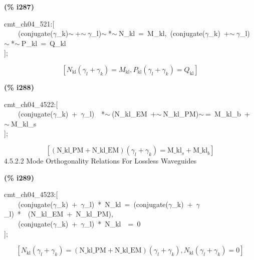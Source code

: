 \documentclass[fleqn]{article}
\begin{document}
\noindent
\begin{minipage}[t]{4.000000em}\color{red}\bfseries
(\% i287)	
\end{minipage}
\begin{minipage}[t]{\textwidth}\color{blue}
cmt\_ch04\_521:[\\
\ \ \ \ (conjugate(\ensuremath{\gamma}\_k)\ensuremath{\sim\ }+\ensuremath{\sim\ }\ensuremath{\gamma}\_l)\ensuremath{\sim\ }*\ensuremath{\sim\ }N\_kl\ =\ M\_kl,\ (conjugate(\ensuremath{\gamma}\_k)\ +\ensuremath{\sim\ }\ensuremath{\gamma}\_l)\ensuremath{\sim\ }*\ensuremath{\sim\ }P\_kl\ =\ Q\_kl\\
];
\end{minipage}
\[\displaystyle \tag{\% o287} 
\left[ {N_{\ensuremath{\mathrm{kl}}}} \left( {{\gamma }_l}+{{\gamma }_k}\right) ={M_{\ensuremath{\mathrm{kl}}}}\operatorname{,}{P_{\ensuremath{\mathrm{kl}}}} \left( {{\gamma }_l}+{{\gamma }_k}\right) ={Q_{\ensuremath{\mathrm{kl}}}}\right] \mbox{}
\]


\noindent
\begin{minipage}[t]{4.000000em}\color{red}\bfseries
(\% i288)	
\end{minipage}
\begin{minipage}[t]{\textwidth}\color{blue}
cmt\_ch04\_4522:[\\
\ \ \ \ (conjugate(\ensuremath{\gamma}\_k)\ +\ \ensuremath{\gamma}\_l)\ \ *\ensuremath{\sim\ }(N\_kl\_EM\ +\ensuremath{\sim\ }N\_kl\_PM)\ensuremath{\sim\ }=\ M\_kl\_b\ +\ensuremath{\sim\ }M\_kl\_s\\
];
\end{minipage}
\[\displaystyle \tag{\% o288} 
\left[ \left( \ensuremath{\mathrm{N\_ kl\_ PM}}+\ensuremath{\mathrm{N\_ kl\_ EM}}\right)  \left( {{\gamma }_l}+{{\gamma }_k}\right) ={{\ensuremath{\mathrm{M\_ kl}}}_s}+{{\ensuremath{\mathrm{M\_ kl}}}_b}\right] \mbox{}
\]
4.5.2.2     Mode Orthogonality Relations For Lossless Waveguides


\noindent
\begin{minipage}[t]{4.000000em}\color{red}\bfseries
(\% i289)	
\end{minipage}
\begin{minipage}[t]{\textwidth}\color{blue}
cmt\_ch04\_4523:[\\
\ \ \ \ (conjugate(\ensuremath{\gamma}\_k)\ +\ \ensuremath{\gamma}\_l)\ *\ N\_kl\ =\ (conjugate(\ensuremath{\gamma}\_k)\ +\ \ensuremath{\gamma}\_l)\ *\ \ (N\_kl\_EM\ +\ N\_kl\_PM),\\
\ \ \ \ (conjugate(\ensuremath{\gamma}\_k)\ +\ \ensuremath{\gamma}\_l)\ *\ N\_kl\ \ =\ 0\\
];
\end{minipage}
\[\displaystyle \tag{\% o289} 
\left[ {N_{\ensuremath{\mathrm{kl}}}} \left( {{\gamma }_l}+{{\gamma }_k}\right) =\left( \ensuremath{\mathrm{N\_ kl\_ PM}}+\ensuremath{\mathrm{N\_ kl\_ EM}}\right)  \left( {{\gamma }_l}+{{\gamma }_k}\right) \operatorname{,}{N_{\ensuremath{\mathrm{kl}}}} \left( {{\gamma }_l}+{{\gamma }_k}\right) =0\right] \mbox{}
\]
\end{document}
